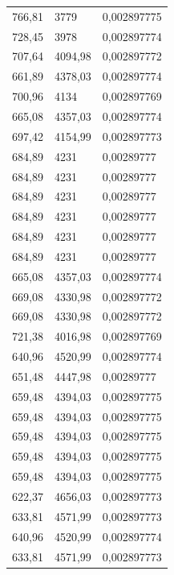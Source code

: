 \begin{center}
\begin{longtable}{|l|l|l|}
766,81            & 3779              & 0,002897775 \\
728,45            & 3978              & 0,002897774 \\
707,64            & 4094,98           & 0,002897772 \\
661,89            & 4378,03           & 0,002897774 \\
700,96            & 4134              & 0,002897769 \\
665,08            & 4357,03           & 0,002897774 \\
697,42            & 4154,99           & 0,002897773 \\
684,89            & 4231              & 0,00289777  \\
684,89            & 4231              & 0,00289777  \\
684,89            & 4231              & 0,00289777  \\
684,89            & 4231              & 0,00289777  \\
684,89            & 4231              & 0,00289777  \\
684,89            & 4231              & 0,00289777  \\
665,08            & 4357,03           & 0,002897774 \\
669,08            & 4330,98           & 0,002897772 \\
669,08            & 4330,98           & 0,002897772 \\
721,38            & 4016,98           & 0,002897769 \\
640,96            & 4520,99           & 0,002897774 \\
651,48            & 4447,98           & 0,00289777  \\
659,48            & 4394,03           & 0,002897775 \\
659,48            & 4394,03           & 0,002897775 \\
659,48            & 4394,03           & 0,002897775 \\
659,48            & 4394,03           & 0,002897775 \\
659,48            & 4394,03           & 0,002897775 \\
622,37            & 4656,03           & 0,002897773 \\
633,81            & 4571,99           & 0,002897773 \\
640,96            & 4520,99           & 0,002897774 \\
633,81            & 4571,99           & 0,002897773 \\

\end{longtable}
\end{center}
